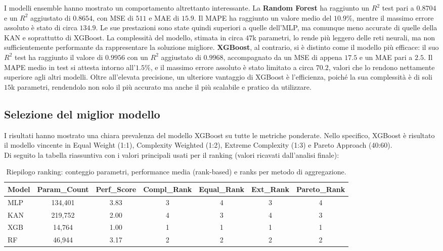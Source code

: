 \documentclass[a4paper,12pt]{report}
\begin{document}
	I modelli ensemble hanno mostrato un comportamento altrettanto interessante. La \textbf{Random Forest} ha raggiunto un $R^2$ test pari a $0.8704$ e un $R^2$ aggiustato di $0.8654$, con MSE di $511$ e MAE di $15.9$. Il MAPE ha raggiunto un valore medio del $10.9\%$, mentre il massimo errore assoluto è stato di circa $134.9$. Le sue prestazioni sono state quindi superiori a quelle dell’MLP, ma comunque meno accurate di quelle della KAN e soprattutto di XGBoost. La complessità del modello, stimata in circa $47$k parametri, lo rende più leggero delle reti neurali, ma non sufficientemente performante da rappresentare la soluzione migliore. \textbf{XGBoost}, al contrario, si è distinto come il modello più efficace: il suo $R^2$ test ha raggiunto il valore di $0.9956$ con un $R^2$ aggiustato di $0.9968$, accompagnato da un MSE di appena $17.5$ e un MAE pari a $2.5$. Il MAPE medio in test si attesta intorno all’$1.5\%$, e il massimo errore assoluto è stato limitato a circa $70.2$, valori che lo rendono nettamente superiore agli altri modelli. Oltre all’elevata precisione, un ulteriore vantaggio di XGBoost è l’efficienza, poiché la sua complessità è di soli $15$k parametri, rendendolo non solo il più accurato ma anche il più scalabile e pratico da utilizzare. \\
	
	\subsection{Selezione del miglior modello}
	I risultati hanno mostrato una chiara prevalenza del modello XGBoost su tutte le metriche ponderate. Nello specifico, XGBoost è risultato il modello vincente in Equal Weight (1:1), Complexity Weighted (1:2), Extreme Complexity (1:3) e Pareto Approach (40:60). \\
	Di seguito la tabella riassuntiva con i valori principali usati per il ranking (valori ricavati dall'analisi finale):
	
	\begin{table}[H]
		\centering
		\setlength{\tabcolsep}{2pt}
		\small
		\begin{tabular}{lcccccc}
			\toprule
			\textbf{Model} & \textbf{Param\_Count} & \textbf{Perf\_Score} & \textbf{Compl\_Rank} & \textbf{Equal\_Rank} & \textbf{Ext\_Rank} & \textbf{Pareto\_Rank} \\
			\midrule
			MLP           & 134,401 & 3.83 & 3 & 4 & 3 & 4 \\
			KAN           & 219,752 & 2.00 & 4 & 3 & 4 & 3 \\
			XGB 		  & 14,764  & 1.00 & 1 & 1 & 1 & 1 \\
			RF 			  & 46,944  & 3.17 & 2 & 2 & 2 & 2 \\
			\bottomrule
		\end{tabular}
		\caption{Riepilogo ranking: conteggio parametri, performance media (rank-based) e ranks per metodo di aggregazione.}
	\end{table}
	
\end{document}
